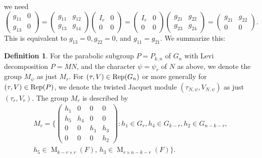 \documentclass[reqno]{amsart}
\theoremstyle{definition}
\newtheorem{definition}[theorem]{Definition}
\theoremstyle{remark}
\numberwithin{equation}{section}
\DeclareMathOperator{\M}{M}
\newcommand{\bbsm}{\left (\begin{smallmatrix}}      \newcommand{\besm}{\end{smallmatrix}\right )}
\begin{document}
we need 
\[ \bbsm g_{11} & 0  \\ g_{13} & 0 \besm =\bbsm g_{11} & g_{12} \\ g_{13} & g_{14} \besm \bbsm 
I_r & 0 \\
0 & 0
\besm = \bbsm 
I_r & 0 \\
0 & 0
\besm
\bbsm g_{21} & g_{22} \\ g_{23} & g_{24} \besm=
\bbsm g_{21} & g_{22} \\ 0 & 0 \besm.
\]
This is  equivalent to $g_{13}=0, g_{22}=0$, and $g_{11}=g_{21}$.  We summarize this:
\begin{definition} \label{def_Mpsi}
    For the parabolic subgroup $P = P_{k,n}$ of $G_n$ with Levi decomposition $P = MN$, and the character $\psi=\psi_r$ of $N$ as above, we denote the group $M_\psi$ as just $M_r$. For $(\tau,V) \in {\rm Rep}(G_n)$ or more generally for $(\tau,V) \in {\rm Rep}(P)$, we denote the twisted Jacquet module $(\tau_{N, \psi}, V_{N,\psi})$ as just $(\tau_r, V_r)$. The group $M_r$ is described by 
    \begin{multline} \label{eq:Mpsi}
    M_r=\Bigg\{ \bbsm h_1 &  0 & 0&0\\
    h_5 & h_4&0&0\\
    0&0&h_1& h_3\\0&0&0&h_2 \besm \colon h_1\in G_r, h_4\in G_{k-r}, h_2\in G_{n-k-r},\\  
    h_5\in \M_{k-r \times r}(F), \, h_3\in \M_{ r \times n-k-r}(F)
    \Bigg\}.
\end{multline}

\end{definition}

 
\end{document}
